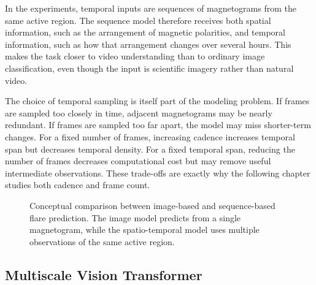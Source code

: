 In the experiments, temporal inputs are sequences of magnetograms from the same active region. The sequence model therefore receives both spatial information, such as the arrangement of magnetic polarities, and temporal information, such as how that arrangement changes over several hours. This makes the task closer to video understanding than to ordinary image classification, even though the input is scientific imagery rather than natural video.

The choice of temporal sampling is itself part of the modeling problem. If frames are sampled too closely in time, adjacent magnetograms may be nearly redundant. If frames are sampled too far apart, the model may miss shorter-term changes. For a fixed number of frames, increasing cadence increases temporal span but decreases temporal density. For a fixed temporal span, reducing the number of frames decreases computational cost but may remove useful intermediate observations. These trade-offs are exactly why the following chapter studies both cadence and frame count.

\begin{figure}[H]
\centering
{}
\caption{Conceptual comparison between image-based and sequence-based flare prediction. The image model predicts from a single magnetogram, while the spatio-temporal model uses multiple observations of the same active region.}
\label{fig:intro_image_vs_sequence}
\end{figure}

\subsection{Multiscale Vision Transformer}

